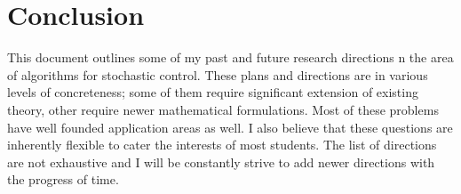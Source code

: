 \documentclass[onecolumn,12pt]{IEEEtran}
\begin{document}
\section{Conclusion}
This document outlines some of my past and future research directions n the area of algorithms for stochastic control. These plans and directions are in various levels of concreteness; some of them require significant extension of existing theory, other require newer mathematical formulations. Most of these problems have well founded application areas as well. I also believe that these questions are inherently flexible to cater the interests of most students. The list of directions are not exhaustive and I will be constantly strive to add newer directions with the progress of time.


\end{document}

